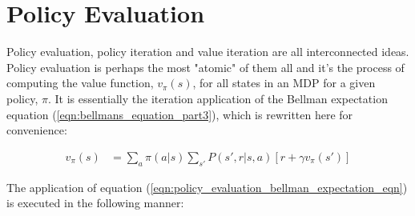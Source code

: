 \documentclass[a4paper,11pt]{article}
\begin{document}
\section{Policy Evaluation}
\label{sec:policy_evaluation}

Policy evaluation, policy iteration and value iteration are all interconnected ideas.  Policy evaluation is perhaps the most "atomic" of them all and it's the process of computing the value function, $v_{\pi}(s)$, for all states in an MDP for a given policy, $\pi$.  It is essentially the iteration application of the Bellman expectation equation (\ref{eqn:bellmans_equation_part3}), which is rewritten here for convenience:

\begin{equation} \label{eqn:policy_evaluation_bellman_expectation_eqn}
    \begin{split}
        v_\pi (s) &= \sum_{a} \pi(a|s) \sum_{s'} P(s',r|s,a) [r + \gamma v_{\pi}(s')]
    \end{split}
\end{equation}

The application of equation (\ref{eqn:policy_evaluation_bellman_expectation_eqn}) is executed in the following manner:
\end{document}
